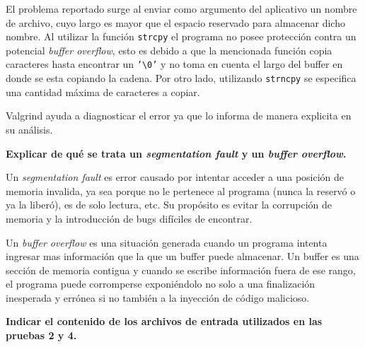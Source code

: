 \documentclass{article}
\begin{document}
    El problema reportado surge al enviar como argumento del aplicativo un nombre de archivo, cuyo largo es mayor que el espacio reservado para almacenar dicho nombre. Al utilizar la función \texttt{strcpy} el programa no posee protección contra un potencial \textit{buffer overflow}, esto es debido a que la mencionada función copia caracteres hasta encontrar un \texttt{'\textbackslash 0'} y no toma en cuenta el largo del buffer en donde se esta copiando la cadena. Por otro lado, utilizando \texttt{strncpy} se especifica una cantidad máxima de caracteres a copiar.
    
    Valgrind ayuda a diagnosticar el error ya que lo informa de manera explicita en su análisis.\newline
    
\textbf{Explicar de qué se trata un \textit{segmentation fault} y un \textit{buffer overflow}.}\newline

    Un \textit{segmentation fault} es error causado por intentar acceder a una posición de memoria invalida, ya sea porque no le pertenece al programa (nunca la reservó o ya la liberó), es de solo lectura, etc. Su propósito es evitar la corrupción de memoria y la introducción de bugs difíciles de encontrar.  
    
    Un \textit{buffer overflow} es una situación generada cuando un programa intenta ingresar mas información que la que un buffer puede almacenar. Un buffer es una sección de memoria contigua y cuando se escribe información fuera de ese rango, el programa puede corromperse exponiéndolo no solo a una finalización inesperada y errónea si no también a la inyección de código malicioso.\newline
    
\textbf{Indicar el contenido de los archivos de entrada utilizados en las pruebas 2 y 4.}
\end{document}
